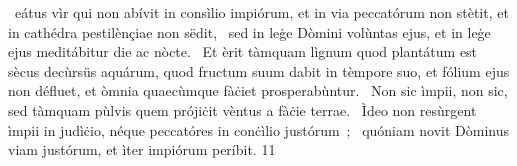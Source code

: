{%
~eátus vìr qui non abívit in consìlio impiórum, et in via peccatórum non stètit, et in cathédra pestilènçiae non sëdit,
~sed in leġe Dòmini volùntas ejus, et in leġe ejus meditábitur die ac nòcte.
~Et èrit tàmquam lìgnum quod plantátum est sècus decùrsüs aquárum, quod fructum suum dabit in tèmpore suo, et fólium ejus non défluet, et òmnia quaecùmque fàċiet prosperabùntur.
~Non sic ìmpii, non sic, sed tàmquam pùlvis quem prójiċit vèntus a fàċie terrae.
~Ìdeo non resùrgent ìmpii in judìċio, néque peccatóres in conċìlio justórum~;
~quóniam novit Dòminus viam justórum, et ìter impiórum períbit.
}
{1}{1}
